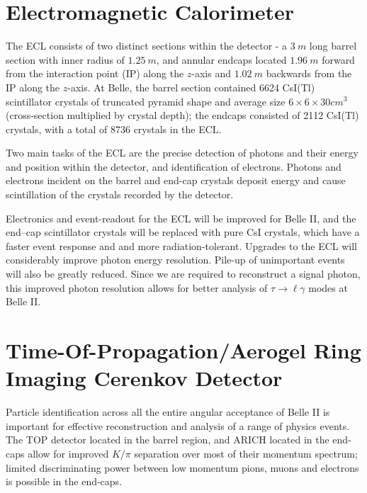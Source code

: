 \documentclass[12pt]{thesis}  %
\begin{document}


\section{Electromagnetic Calorimeter}

The ECL consists of two distinct sections within the detector - a $\SI{3}{m}$ long barrel section with inner radius of $\SI{1.25}{m}$, and annular endcaps located $\SI{1.96}{m}$ forward from the interaction point (IP) along the $z$-axis and $\SI{1.02}{m}$ backwards from the IP along the $z$-axis. At Belle, the barrel section contained 6624 CsI(Tl) scintillator crystals of truncated pyramid shape and average size $6\times 6\times 30\si{cm^3}$ (cross-section multiplied by crystal depth); the endcaps consisted of 2112 CsI(Tl) crystals, with a total of 8736 crystals in the ECL. 

Two main tasks of the ECL are the precise detection of photons and their energy and position within the detector, and identification of electrons. Photons and electrons incident on the barrel and end-cap crystals deposit energy and cause scintillation of the crystals recorded by the detector.

Electronics and event-readout for the ECL will be improved for Belle II, and the end–cap scintillator crystals will be replaced with pure CsI crystals, which have a faster event response and and more radiation-tolerant. Upgrades to the ECL will considerably improve photon energy resolution. Pile-up of unimportant events will also be greatly reduced. Since we are required to reconstruct a signal photon, this improved photon resolution allows for better analysis of $\tau\to\ell\gamma$ modes at Belle II.


\section{Time-Of-Propagation/Aerogel Ring Imaging Cerenkov Detector}

Particle identification across all the entire angular acceptance of Belle II is important for effective reconstruction and analysis of a range of physics events. The TOP detector located in the barrel region, and ARICH located in the end-caps allow for improved $K/\pi$ separation over most of their momentum spectrum; limited discriminating power between low momentum pions, muons and electrons is possible in the end-caps.
\end{document}
